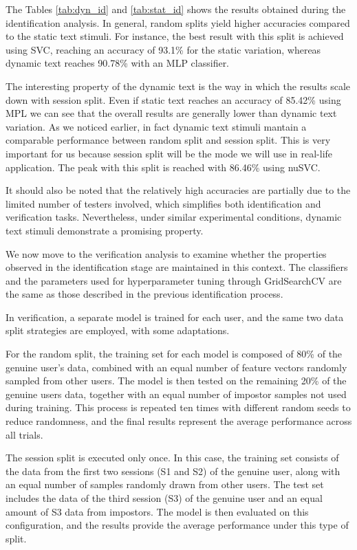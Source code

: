 \documentclass[12pt]{report}
\begin{document}
The Tables \ref{tab:dyn_id} and \ref{tab:stat_id} shows the results obtained during the identification analysis. 
In general, random splits yield higher accuracies compared to the static text stimuli. 
For instance, the best result with this split is achieved using SVC, reaching an accuracy of 93.1\% for the static variation, whereas dynamic text reaches 90.78\% with an MLP classifier.

The interesting property of the dynamic text is the way in which the results scale down with session split. 
Even if static text reaches an accuracy of 85.42\% using MPL we can see that the overall results are generally lower than dynamic text variation. 
As we noticed earlier, in fact dynamic text stimuli mantain a comparable performance between random split and session split. 
This is very important for us because session split will be the mode we will use in real-life application. 
The peak with this split is reached with 86.46\% using nuSVC.

It should also be noted that the relatively high accuracies are partially due to the limited number of testers involved, which simplifies both identification and verification tasks. 
Nevertheless, under similar experimental conditions, dynamic text stimuli demonstrate a promising property.

We now move to the verification analysis to examine whether the properties observed in the identification stage are maintained in this context.
The classifiers and the parameters used for hyperparameter tuning through GridSearchCV are the same as those described in the previous identification process.

In verification, a separate model is trained for each user, and the same two data split strategies are employed, with some adaptations.

For the random split, the training set for each model is composed of 80\% of the genuine user’s data, combined with an equal number of feature vectors randomly sampled from other users. 
The model is then tested on the remaining 20\% of the genuine users data, together with an equal number of impostor samples not used during training.
This process is repeated ten times with different random seeds to reduce randomness, and the final results represent the average performance across all trials.

The session split is executed only once. 
In this case, the training set consists of the data from the first two sessions (S1 and S2) of the genuine user, along with an equal number of samples randomly drawn from other users. 
The test set includes the data of the third session (S3) of the genuine user and an equal amount of S3 data from impostors.
The model is then evaluated on this configuration, and the results provide the average performance under this type of split.
\end{document}
